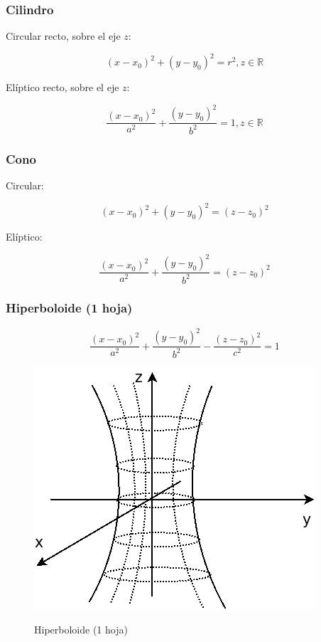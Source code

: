 \documentclass{article}
\renewcommand{\Bbb}{\mathbb}
\begin{document}
\subsubsection{Cilindro}

Circular recto, sobre el eje $z$:

\begin{equation}
(x-x_0)^2 + (y-y_0)^2 = r^2, z \in \Bbb R
\end{equation}

Elíptico recto, sobre el eje $z$:

\begin{equation}
\frac{(x-x_0)^2}{a^2} + \frac{(y-y_0)^2}{b^2} = 1, z \in \Bbb R
\end{equation}

\subsubsection{Cono}

Circular:

\begin{equation}
(x-x_0)^2 + (y-y_0)^2 = (z-z_0)^2
\end{equation}

Elíptico:

\begin{equation}
\frac{(x-x_0)^2}{a^2} + \frac{(y-y_0)^2}{b^2} = (z-z_0)^2
\end{equation}

\subsubsection{Hiperboloide (1 hoja)}

\begin{equation}
\frac{(x-x_0)^2}{a^2} + \frac{(y-y_0)^2}{b^2} - \frac{(z-z_0)^2}{c^2} = 1
\end{equation}

\begin{figure}[t]
\caption{Hiperboloide (1 hoja)}
\includegraphics[scale=0.75]{img/pra_fig003_hiperboloide1.png} 
\centering
\label{fig:hiperboloide1}
\end{figure}
\end{document}
